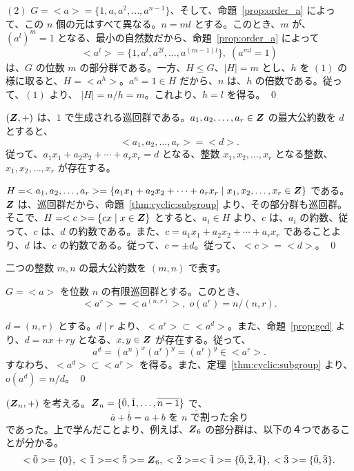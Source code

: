 $(2)$ $G = <a> = \{1, a, a^2, \ldots, a^{n-1}\}$、そして、命題~\ref{prop:order_a} によって、この $n$ 個の元はすべて異なる。$n = ml$ とする。このとき、$m$ が、$(a^l)^m = 1$ となる、最小の自然数だから、命題~\ref{prop:order_a} によって
$$<a^l> = \{1,a^l,a^{2l},\ldots,a^{(m-1)l}\},\;(a^{ml} = 1)$$
は、$G$ の位数 $m$ の部分群である。一方、$H\leq G$、$|H| = m$ とし、$h$ を $(1)$ の様に取ると、$H = <a^h>$。$a^n = 1\in H$ だから、$n$ は、$h$ の倍数である。従って、$(1)$ より、
$|H| = n/h = m$。これより、$h = l$ を得る。
\qed

\begin{prop} \label{prop:gcd}
$(\mbox{\boldmath $Z$},+)$ は、$1$ で生成される巡回群である。$a_1,a_2,\ldots,a_r\in\mbox{\boldmath $Z$}$ の最大公約数を $d$ とすると、
$$<a_1, a_2, \ldots, a_r> = <d>.$$
従って、$a_1x_1 + a_2x_2 + \cdots + a_rx_r = d$ となる、整数 $x_1, x_2, \ldots, x_r$ となる整数、$x_1, x_2, \ldots, x_r$ が存在する。
\end{prop}
\proof
$H = <a_1,a_2, \ldots, a_r> = \{a_1x_1 + a_2x_2 + \cdots + a_rx_r \mid x_1, x_2, \ldots, x_r\in\mbox{\boldmath $Z$}\}$ である。$\mbox{\boldmath $Z$}$ は、巡回群だから、命題~\ref{thm:cyclic:subgroup} より、その部分群も巡回群。そこで、$H = <c> = \{cx\mid x\in \mbox{\boldmath $Z$}\}$ とすると、$a_i\in H$ より、$c$ は、$a_i$ の約数、従って、$c$ は、$d$ の約数である。また、$c = a_1x_1 + a_2x_2 + \cdots + a_rx_r$  であることより、$d$ は、$c$ の約数である。従って、$c = \pm d$。従って、$<c> = <d>$。
\qed

\medskip
二つの整数 $m, n$  の最大公約数を $(m,n)$ で表す。

\begin{prop}
$G = <a>$ を位数 $n$ の有限巡回群とする。このとき、
$$<a^r> = <a^{(n,r)}>, \; o(a^r) = n/(n,r).$$
\end{prop}
\proof
$d = (n,r)$ とする。$d\mid r$ より、$<a^r>\subset <a^d>$。また、命題~\ref{prop:gcd} より、$d = nx + ry$ となる、$x,y\in\mbox{\boldmath $Z$}$ が存在する。従って、
$$a^d = (a^n)^x(a^r)^y = (a^r)^y\in <a^r>.$$
すなわち、$<a^d>\subset <a^r>$ を得る。また、定理~\ref{thm:cyclic:subgroup} より、$o(a^d) = n/d$。
\qed

\begin{eg}
$(\mbox{\boldmath $Z$}_n,+)$ を考える。$\mbox{\boldmath $Z$}_n = \{\bar{0},\bar{1},\ldots,\overline{n-1}\}$ で、
$$\bar{a} + \bar{b} = \overline{a+b \mbox{ を $n$ で割った余り}}$$
であった。上で学んだことより、例えば、$\mbox{\boldmath $Z$}_6$ の部分群は、以下の４つであることが分かる。
$$<\bar{0}> = \{0\},\;<\bar{1}> = <\bar{5}> = \mbox{\boldmath $Z$}_6,\;<\bar{2}> = <\bar{4}> = \{\bar{0},\bar{2},\bar{4}\},\;<\bar{3}> = \{\bar{0},\bar{3}\}.$$
\end{eg}

